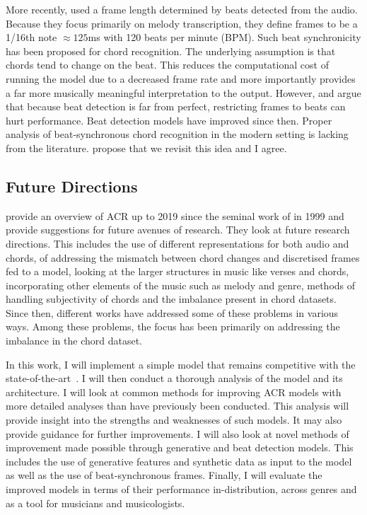 More recently, \citet{MelodyTranscriptionViaGenerativePreTraining} used a frame length determined by beats detected from the audio. Because they focus primarily on melody transcription, they define frames to be a 1/16th note $\approx 125$ms with 120 beats per minute (BPM). Such beat synchronicity has been proposed for chord recognition. The underlying assumption is that chords tend to change on the beat. This reduces the computational cost of running the model due to a decreased frame rate and more importantly provides a far more musically meaningful interpretation to the output. However, \citet{CommonVariations} and \citet{RelativePerformance} argue that because beat detection is far from perfect, restricting frames to beats can hurt performance. Beat detection models have improved since then. Proper analysis of beat-synchronous chord recognition in the modern setting is lacking from the literature.  \citet{20YearsofACR} propose that we revisit this idea and I agree.

\subsection{Future Directions}

\citet{20YearsofACR} provide an overview of ACR up to 2019 since the seminal work of \citet{FujishimaACR} in 1999 and provide suggestions for future avenues of research. They look at future research directions. This includes the use of different representations for both audio and chords, of addressing the mismatch between chord changes and discretised frames fed to a model, looking at the larger structures in music like verses and chords, incorporating other elements of the music such as melody and genre, methods of handling subjectivity of chords and the imbalance present in chord datasets. Since then, different works have addressed some of these problems in various ways. Among these problems, the focus has been primarily on addressing the imbalance in the chord dataset. 

In this work, I will implement a simple model that remains competitive with the state-of-the-art~\citep{StructuredTraining}. I will then conduct a thorough analysis of the model and its architecture. I will look at common methods for improving ACR models with more detailed analyses than have previously been conducted. This  analysis will provide insight into the strengths and weaknesses of such models. It may also provide guidance for further improvements. I will also look at novel methods of improvement made possible through generative and beat detection models. This includes the use of generative features and synthetic data as input to the model as well as the use of beat-synchronous frames. Finally, I will evaluate the improved models in terms of their performance in-distribution, across genres and as a tool for musicians and musicologists.

